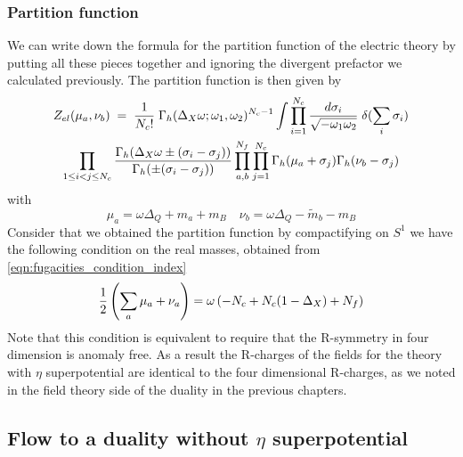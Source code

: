 \subsubsection{Partition function}
We can write down the formula for the partition function of the electric theory by putting all these pieces together and ignoring the divergent prefactor we calculated previously. 
The partition function is then given by
\begin{multline}
Z_{el} ( \mu_a , \nu_b ) \; = 
\; {1 \over N_c ! } \;
\Gamma_h ( \Delta_X \omega ; \omega_1 , \omega_2)^{N_c-1}
\int
\prod_{i=1}^{N_c} \frac{d \sigma_i}{\sqrt{- \omega_1 \omega_2}} \; \delta( \sum_i \sigma_i)  \\
 \prod_{ 1 \leq i<j \leq N_c} \frac{ \Gamma_h( \Delta_X \omega \pm (\sigma_i - \sigma_j)) }{ \Gamma_h ( \pm (\sigma_i - \sigma_j) )}
 \prod_{a,b}^{N_f} \prod_{j=1}^{N_c} \Gamma_h ( \mu_a + \sigma_j) \Gamma_h ( \nu_b - \sigma_j)
\end{multline}
with 
\begin{equation}
 \mu_a = \omega \Delta_Q + m_a + m_B  \quad  \nu_b = \omega \Delta_Q - \tilde m_b - m_B
\end{equation}
Consider that we obtained the partition function by compactifying on $S^1$ we have the following condition on the real masses, obtained from \eqref{eqn:fugacities_condition_index}
\begin{equation}
	{ 1 \over 2 }\left(  \sum_a \mu_a + \nu_a  \right) = \omega \left( - N_c + N_c (1 - \Delta_X )  + N_f  \right)
	\label{eqn:R-symm Anomaly}
\end{equation}
Note that this condition is equivalent to require that the R-symmetry in four dimension is anomaly free. 
As a result the R-charges of the fields for the theory with $\eta$ superpotential are identical to the four dimensional R-charges, as we noted in the field theory side of the duality in the previous chapters.\\




\subsection{Flow to a duality without $\eta$ superpotential}

